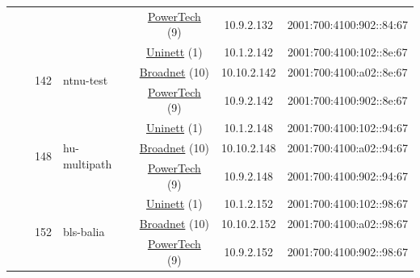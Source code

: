 \begin{small}
\begin{center}
\begin{longtable}{|c|c|c|c|c|c|c|c|}
  &  &  &  & \multicolumn{2}{|c|}{\tiny{\href{http://www.powertech.no}{PowerTech} (9)}} & \tiny{10.9.2.132} & \tiny{2001:700:4100:902::84:67} \\* \cline{3-3}\cline{4-4}\cline{5-5}\cline{6-6}\cline{7-7}\cline{8-8}
  &  & \multirow{3}{*}{\tiny{142}} & \multicolumn{1}{|l|}{\multirow{3}{*}{\tiny{ntnu-test}}} & \multicolumn{2}{|c|}{\tiny{\href{https://www.uninett.no}{Uninett} (1)}} & \tiny{10.1.2.142} & \tiny{2001:700:4100:102::8e:67} \\* \cline{5-5}\cline{6-6}\cline{7-7}\cline{8-8}
  &  &  &  & \multicolumn{2}{|c|}{\tiny{\href{https://www.broadnet.no}{Broadnet} (10)}} & \tiny{10.10.2.142} & \tiny{2001:700:4100:a02::8e:67} \\* \cline{5-5}\cline{6-6}\cline{7-7}\cline{8-8}
  &  &  &  & \multicolumn{2}{|c|}{\tiny{\href{http://www.powertech.no}{PowerTech} (9)}} & \tiny{10.9.2.142} & \tiny{2001:700:4100:902::8e:67} \\* \cline{3-3}\cline{4-4}\cline{5-5}\cline{6-6}\cline{7-7}\cline{8-8}
  &  & \multirow{3}{*}{\tiny{148}} & \multicolumn{1}{|l|}{\multirow{3}{*}{\tiny{hu-multipath}}} & \multicolumn{2}{|c|}{\tiny{\href{https://www.uninett.no}{Uninett} (1)}} & \tiny{10.1.2.148} & \tiny{2001:700:4100:102::94:67} \\* \cline{5-5}\cline{6-6}\cline{7-7}\cline{8-8}
  &  &  &  & \multicolumn{2}{|c|}{\tiny{\href{https://www.broadnet.no}{Broadnet} (10)}} & \tiny{10.10.2.148} & \tiny{2001:700:4100:a02::94:67} \\* \cline{5-5}\cline{6-6}\cline{7-7}\cline{8-8}
  &  &  &  & \multicolumn{2}{|c|}{\tiny{\href{http://www.powertech.no}{PowerTech} (9)}} & \tiny{10.9.2.148} & \tiny{2001:700:4100:902::94:67} \\* \cline{3-3}\cline{4-4}\cline{5-5}\cline{6-6}\cline{7-7}\cline{8-8}
  &  & \multirow{3}{*}{\tiny{152}} & \multicolumn{1}{|l|}{\multirow{3}{*}{\tiny{bls-balia}}} & \multicolumn{2}{|c|}{\tiny{\href{https://www.uninett.no}{Uninett} (1)}} & \tiny{10.1.2.152} & \tiny{2001:700:4100:102::98:67} \\* \cline{5-5}\cline{6-6}\cline{7-7}\cline{8-8}
  &  &  &  & \multicolumn{2}{|c|}{\tiny{\href{https://www.broadnet.no}{Broadnet} (10)}} & \tiny{10.10.2.152} & \tiny{2001:700:4100:a02::98:67} \\* \cline{5-5}\cline{6-6}\cline{7-7}\cline{8-8}
  &  &  &  & \multicolumn{2}{|c|}{\tiny{\href{http://www.powertech.no}{PowerTech} (9)}} & \tiny{10.9.2.152} & \tiny{2001:700:4100:902::98:67} \\* \cline{3-3}\cline{4-4}\cline{5-5}\cline{6-6}\cline{7-7}\cline{8-8}

\end{longtable}
\end{center}
\end{small}

